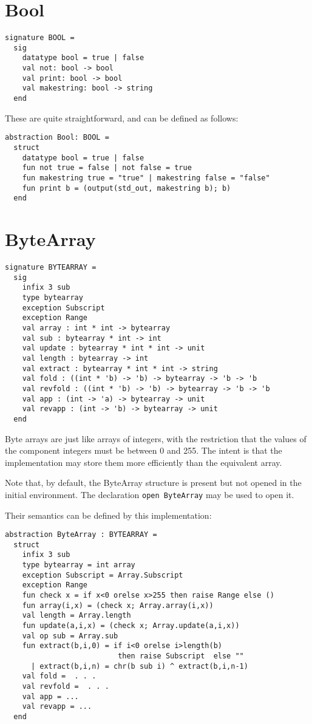 \section{Bool}
\begin{verbatim}
signature BOOL =
  sig
    datatype bool = true | false
    val not: bool -> bool
    val print: bool -> bool
    val makestring: bool -> string
  end
\end{verbatim}
These are quite straightforward, and can be defined as follows:
\begin{verbatim}
abstraction Bool: BOOL =
  struct
    datatype bool = true | false
    fun not true = false | not false = true
    fun makestring true = "true" | makestring false = "false"
    fun print b = (output(std_out, makestring b); b)
  end
\end{verbatim}
\section{ByteArray}
\begin{verbatim}
signature BYTEARRAY =
  sig
    infix 3 sub
    type bytearray
    exception Subscript
    exception Range
    val array : int * int -> bytearray
    val sub : bytearray * int -> int
    val update : bytearray * int * int -> unit
    val length : bytearray -> int
    val extract : bytearray * int * int -> string
    val fold : ((int * 'b) -> 'b) -> bytearray -> 'b -> 'b
    val revfold : ((int * 'b) -> 'b) -> bytearray -> 'b -> 'b
    val app : (int -> 'a) -> bytearray -> unit
    val revapp : (int -> 'b) -> bytearray -> unit
  end
\end{verbatim}
Byte arrays are just like arrays of integers, with the restriction
that the values of the component integers must be between 0 and 255.
The intent is that the implementation may store them more efficiently
than the equivalent array.

Note that, by default, the ByteArray structure is present but 
not opened in the 
initial environment.  The declaration \verb"open ByteArray" may be
used to open it.

Their semantics can be defined by this implementation:
\begin{verbatim}
abstraction ByteArray : BYTEARRAY =
  struct
    infix 3 sub
    type bytearray = int array
    exception Subscript = Array.Subscript
    exception Range
    fun check x = if x<0 orelse x>255 then raise Range else ()
    fun array(i,x) = (check x; Array.array(i,x))
    val length = Array.length
    fun update(a,i,x) = (check x; Array.update(a,i,x))
    val op sub = Array.sub
    fun extract(b,i,0) = if i<0 orelse i>length(b)
                          then raise Subscript  else ""
      | extract(b,i,n) = chr(b sub i) ^ extract(b,i,n-1)
    val fold =  . . .
    val revfold =  . . .
    val app = ...
    val revapp = ...
  end
\end{verbatim}

